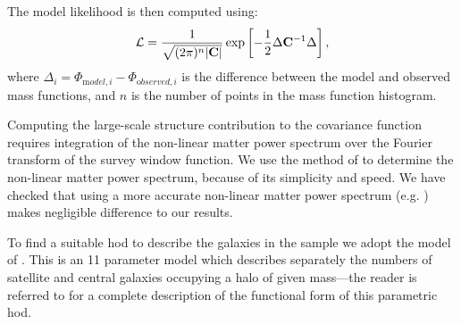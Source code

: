 The model likelihood is then computed using:
\begin{equation}
 \mathcal{L} = {1 \over \sqrt{(2 \pi)^n |{\mathbf C}|}} \exp\left[ -{1\over 2} \Delta {\mathbf C}^{-1} \Delta \right],
\end{equation}
where $\Delta_i = \Phi_{{\mathrm model}, i} - \Phi_{{\mathrm observed}, i}$ is the difference between the model and observed mass functions, and $n$ is the number of points in the mass function histogram.

Computing the large-scale structure contribution to the covariance function requires integration of the non-linear matter power spectrum over the Fourier transform of the survey window function. We use the method of \cite{peacock_non-linear_1996} to determine the non-linear matter power spectrum, because of its simplicity and speed. We have checked that using a more accurate non-linear matter power spectrum (e.g. \citealt{lawrence_coyote_2010}) makes negligible difference to our results.

To find a suitable \gls{hod} to describe the galaxies in the \cite{martin_arecibo_2010} sample we adopt the model of \cite{behroozi_comprehensive_2010}. This is an 11 parameter model which describes separately the numbers of satellite and central galaxies occupying a halo of given mass---the reader is referred to \cite{behroozi_comprehensive_2010} for a complete description of the functional form of this parametric \gls{hod}. 

